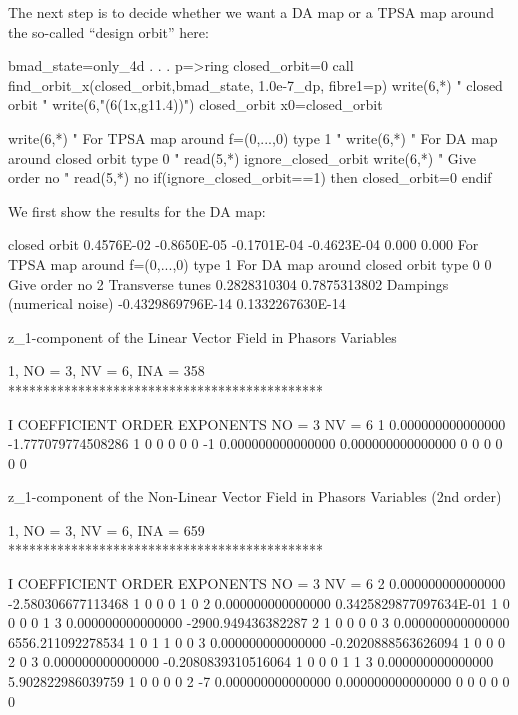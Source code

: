 \documentclass{hitec}     %
\begin{document}
{{ The next step is to decide whether we want a DA map or a TPSA map around the so-called ``design orbit''  here:
 
 \begin{code}
 bmad_state=only_4d
     .
     .
     .
 p=>ring%
closed_orbit=0
call find_orbit_x(closed_orbit,bmad_state, 1.0e-7_dp, fibre1=p)
write(6,*) " closed orbit "
write(6,"(6(1x,g11.4))") closed_orbit
 x0=closed_orbit

write(6,*) " For TPSA map around f=(0,...,0) type 1 "
write(6,*) " For DA map around closed orbit type 0 "
read(5,*) ignore_closed_orbit 
write(6,*) " Give order no "
read(5,*) no
if(ignore_closed_orbit==1) then
 closed_orbit=0
endif
\end{code}
 
 We first show the results for the DA map:
 
 \renewcommand{\codefont}{\footnotesize}
\begin{code}
  closed orbit
  0.4576E-02 -0.8650E-05 -0.1701E-04 -0.4623E-04   0.000       0.000
  For TPSA map around f=(0,...,0) type 1
  For DA map around closed orbit type 0
0
  Give order no
2
 Transverse tunes
  0.2828310304       0.7875313802
 Dampings (numerical noise)
 -0.4329869796E-14   0.1332267630E-14

z_1-component of the Linear Vector Field in Phasors Variables

          1, NO =    3, NV =    6, INA =  358
 *********************************************

    I  COEFFICIENT          ORDER   EXPONENTS
      NO =     3      NV =     6
   1   0.000000000000000      -1.777079774508286       1  0  0  0  0  0
    -1   0.000000000000000       0.000000000000000       0  0  0  0  0  0

 z_1-component of the Non-Linear Vector Field in Phasors Variables (2nd order)

          1, NO =    3, NV =    6, INA =  659
 *********************************************

    I  COEFFICIENT          ORDER   EXPONENTS
      NO =     3      NV =     6
   2   0.000000000000000      -2.580306677113468       1  0  0  0  1  0
   2   0.000000000000000      0.3425829877097634E-01   1  0  0  0  0  1
   3   0.000000000000000      -2900.949436382287       2  1  0  0  0  0
   3   0.000000000000000       6556.211092278534       1  0  1  1  0  0
   3   0.000000000000000     -0.2020888563626094       1  0  0  0  2  0
   3   0.000000000000000     -0.2080839310516064       1  0  0  0  1  1
   3   0.000000000000000       5.902822986039759       1  0  0  0  0  2
    -7   0.000000000000000       0.000000000000000       0  0  0  0  0  0
\end{code}

}}
\end{document}
